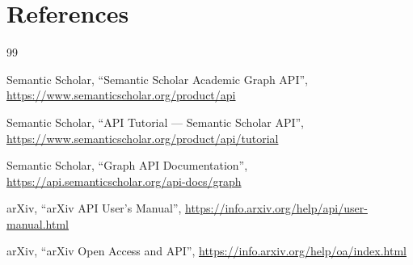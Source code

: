 \documentclass[12pt]{article}
\begin{document}
\section{References}
\begingroup
    \renewcommand{\section}[2]{}
    
    \begin{thebibliography}{99}
    
    Semantic Scholar,
    ``Semantic Scholar Academic Graph API'',
    \url{https://www.semanticscholar.org/product/api}
    
    Semantic Scholar,
    ``API Tutorial — Semantic Scholar API'',
    \url{https://www.semanticscholar.org/product/api/tutorial}
    
    Semantic Scholar,
    ``Graph API Documentation'',
    \url{https://api.semanticscholar.org/api-docs/graph}
    
    arXiv,
    ``arXiv API User's Manual'',
    \url{https://info.arxiv.org/help/api/user-manual.html}
    
    arXiv,
    ``arXiv Open Access and API'',
    \url{https://info.arxiv.org/help/oa/index.html}
    
    \end{thebibliography}
\endgroup
\end{document}
